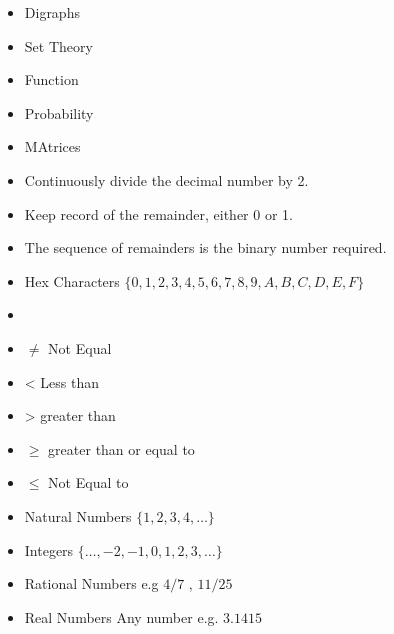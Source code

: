 \documentclass[]{report}
\begin{document}
\begin{enumerate}
\begin{itemize}
\item Digraphs
\item Set Theory
\item Function
\item Probability
\item MAtrices
\end{itemize}



\begin{itemize}
\item Continuously divide the decimal number by 2.
\item Keep record of the remainder, either 0 or 1.
\item The sequence of remainders is the binary number required.
\end{itemize}


\begin{itemize}
\item Hex Characters $\{0,1,2,3,4,5,6,7,8,9,A,B,C,D,E,F\}$
\item 
\end{itemize}


\begin{itemize}
\item $\neq$ Not Equal
\item < Less than
\item > greater than
\item $\geq$ greater than or equal to
\item $\leq$ Not Equal to
\end{itemize}


\begin{itemize}
\item Natural Numbers $\{1,2,3,4, \ldots\}$
\item Integers $\{\ldots,-2,-1,0,1,2,3,\ldots\}$
\item Rational Numbers e.g $4/7$ , $11/25$
\item Real Numbers Any number e.g. $3.1415$
\end{itemize}




\end{enumerate}
\end{document}
